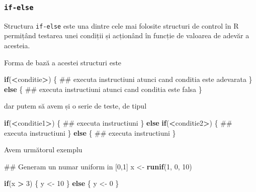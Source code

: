 \documentclass[]{article}
\newenvironment{Shaded}{\begin{snugshade}}{\end{snugshade}}
\newcommand{\KeywordTok}[1]{\textcolor[rgb]{0.13,0.29,0.53}{\textbf{#1}}}
\newcommand{\DecValTok}[1]{\textcolor[rgb]{0.00,0.00,0.81}{#1}}
\newcommand{\StringTok}[1]{\textcolor[rgb]{0.31,0.60,0.02}{#1}}
\newcommand{\ControlFlowTok}[1]{\textcolor[rgb]{0.13,0.29,0.53}{\textbf{#1}}}
\newcommand{\OperatorTok}[1]{\textcolor[rgb]{0.81,0.36,0.00}{\textbf{#1}}}
\newcommand{\NormalTok}[1]{#1}
\newcounter{exo}[section]
\begin{document}
\subsubsection{\texorpdfstring{\texttt{if-else}}{if-else}}\label{if-else}

Structura \texttt{if-else} este una dintre cele mai folosite structuri
de control în R permițând testarea unei condiții și acționând în funcție
de valoarea de adevăr a acesteia.

Forma de bază a acestei structuri este

\begin{Shaded}
\begin{Highlighting}[]
\ControlFlowTok{if}\NormalTok{(}\OperatorTok{<}\NormalTok{conditie}\OperatorTok{>}\NormalTok{) \{}
\NormalTok{        ## executa instructiuni atunci cand conditia este adevarata}
\NormalTok{\} }
\ControlFlowTok{else}\NormalTok{ \{}
\NormalTok{        ## executa instructiuni atunci cand conditia este falsa}
\NormalTok{\}}
\end{Highlighting}
\end{Shaded}

dar putem să avem și o serie de teste, de tipul

\begin{Shaded}
\begin{Highlighting}[]
\ControlFlowTok{if}\NormalTok{(}\OperatorTok{<}\NormalTok{conditie1}\OperatorTok{>}\NormalTok{) \{}
\NormalTok{        ## executa instructiuni}
\NormalTok{\} }\ControlFlowTok{else} \ControlFlowTok{if}\NormalTok{(}\OperatorTok{<}\NormalTok{conditie2}\OperatorTok{>}\NormalTok{)  \{}
\NormalTok{        ## executa instructiuni}
\NormalTok{\} }\ControlFlowTok{else}\NormalTok{ \{}
\NormalTok{        ## executa instructiuni}
\NormalTok{\}}
\end{Highlighting}
\end{Shaded}

Avem următorul exemplu

\begin{Shaded}
\begin{Highlighting}[]
\NormalTok{## Generam un numar uniform in [0,1]}
\NormalTok{x <-}\StringTok{ }\KeywordTok{runif}\NormalTok{(}\DecValTok{1}\NormalTok{, }\DecValTok{0}\NormalTok{, }\DecValTok{10}\NormalTok{)  }

\ControlFlowTok{if}\NormalTok{(x }\OperatorTok{>}\StringTok{ }\DecValTok{3}\NormalTok{) \{}
\NormalTok{        y <-}\StringTok{ }\DecValTok{10}
\NormalTok{\} }\ControlFlowTok{else}\NormalTok{ \{}
\NormalTok{        y <-}\StringTok{ }\DecValTok{0}
\NormalTok{\}}
\end{Highlighting}
\end{Shaded}
\end{document}
